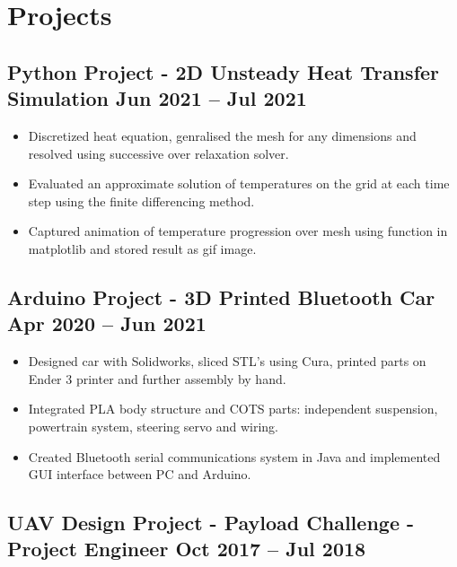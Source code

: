 \documentclass[a4paper,9pt]{article}
\begin{document}
\section*{Projects}

\subsection*{\textbf{Python Project - 2D Unsteady Heat Transfer Simulation }\hfill  Jun 2021 – Jul 2021}

\begin{itemize}[noitemsep]
    \item Discretized heat equation, genralised the mesh for any dimensions and resolved using successive over relaxation solver.
    \item Evaluated an approximate solution of temperatures on the grid at each time step using the finite differencing method.
    \item Captured animation of temperature progression over mesh using function in matplotlib and stored result as gif image.



\end{itemize}

\subsection*{\textbf{Arduino Project - 3D Printed Bluetooth Car } \hfill  Apr 2020 – Jun 2021}
\begin{itemize}[noitemsep]
	\item  Designed car with Solidworks, sliced STL's using Cura, printed parts on Ender 3 printer and further assembly by hand.
	\item  Integrated PLA body structure and COTS parts: independent suspension, powertrain system, steering servo and wiring.
	\item  Created Bluetooth serial communications system in Java and implemented GUI interface between PC and Arduino.


\end{itemize}

\subsection*{\textbf{UAV Design Project - Payload Challenge - Project Engineer } \hfill  Oct 2017 – Jul 2018}
\end{document}
